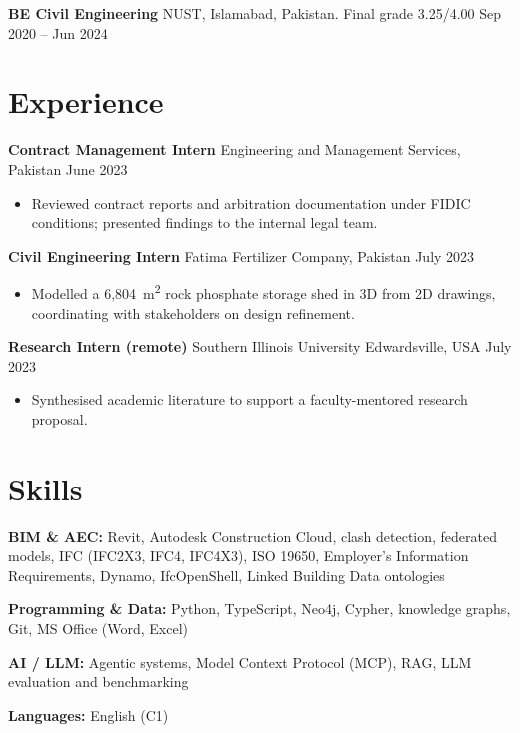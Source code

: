 \documentclass[a4paper,10.5pt]{article}
\newcommand{\datefill}{\dotfill}
\newcommand{\entry}[3]{\vspace{2.5pt}\noindent\textbf{#1} \textbar{} #2 \datefill{} #3\par\vspace{0.5pt}}
\newcommand{\skillrow}[2]{\noindent\textbf{#1:} #2\par\vspace{1pt}}
\begin{document}
\entry{BE Civil Engineering}{NUST, Islamabad, Pakistan. Final grade 3.25/4.00}{Sep 2020 -- Jun 2024}

\section{Experience}
\entry{Contract Management Intern}{Engineering and Management Services, Pakistan}{June 2023}
\begin{itemize}
  \item Reviewed contract reports and arbitration documentation under FIDIC
        conditions; presented findings to the internal legal team.
\end{itemize}

\entry{Civil Engineering Intern}{Fatima Fertilizer Company, Pakistan}{July 2023}
\begin{itemize}
  \item Modelled a 6,804~m\textsuperscript{2} rock phosphate storage shed in 3D from
        2D drawings, coordinating with stakeholders on design refinement.
\end{itemize}

\entry{Research Intern (remote)}{Southern Illinois University Edwardsville, USA}{July 2023}
\begin{itemize}
  \item Synthesised academic literature to support a faculty-mentored research proposal.
\end{itemize}

\section{Skills}

\skillrow{BIM \& AEC}{Revit, Autodesk Construction Cloud, clash detection, federated models, IFC (IFC2X3, IFC4, IFC4X3), ISO 19650, Employer's Information Requirements, Dynamo, IfcOpenShell, Linked Building Data ontologies}
\skillrow{Programming \& Data}{Python, TypeScript, Neo4j, Cypher, knowledge graphs, Git, MS Office (Word, Excel)}
\skillrow{AI / LLM}{Agentic systems, Model Context Protocol (MCP), RAG, LLM evaluation and benchmarking}

\skillrow{Languages}{English (C1)}
\end{document}
